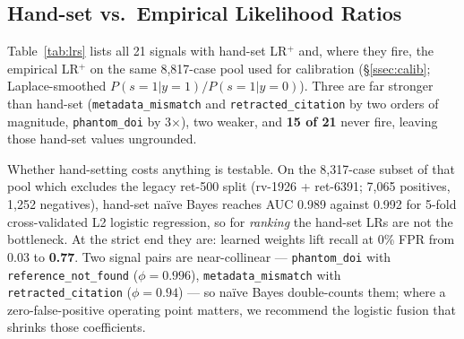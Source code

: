\documentclass[letterpaper]{article} %
\begin{document}
\subsection{Hand-set vs.\ Empirical Likelihood Ratios}

Table~\ref{tab:lrs} lists all 21 signals with hand-set LR$^{+}$ and, where they fire, the empirical LR$^{+}$ on the same 8{,}817-case pool used for calibration (\S\ref{ssec:calib}; Laplace-smoothed $P(s{=}1|y{=}1)/P(s{=}1|y{=}0)$). Three are far stronger than hand-set (\texttt{metadata\_\allowbreak mismatch} and \texttt{retracted\_\allowbreak citation} by two orders of magnitude, \texttt{phantom\_doi} by 3$\times$), two weaker, and \textbf{15 of 21} never fire, leaving those hand-set values ungrounded.

Whether hand-setting costs anything is testable. On the 8{,}317-case subset of that pool which excludes the legacy ret-500 split (rv-1926 + ret-6391; 7{,}065 positives, 1{,}252 negatives), hand-set na\"ive Bayes reaches AUC 0.989 against 0.992 for 5-fold cross-validated L2 logistic regression, so for \emph{ranking} the hand-set LRs are not the bottleneck. At the strict end they are: learned weights lift recall at 0\% FPR from 0.03 to \textbf{0.77}. Two signal pairs are near-collinear --- \texttt{phantom\_doi} with \texttt{reference\_\allowbreak not\_\allowbreak found} ($\phi{=}0.996$), \texttt{metadata\_\allowbreak mismatch} with \texttt{retracted\_\allowbreak citation} ($\phi{=}0.94$) --- so na\"ive Bayes double-counts them; where a zero-false-positive operating point matters, we recommend the logistic fusion that shrinks those coefficients.
\end{document}
